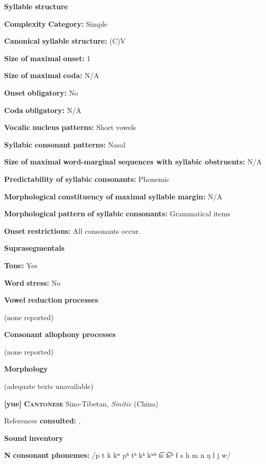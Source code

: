 \textbf{Syllable} \textbf{structure}

\textbf{Complexity} \textbf{Category:} Simple

\textbf{Canonical} \textbf{syllable} \textbf{structure:} (C)V \citep[6]{Bamgbose1966}

\textbf{Size} \textbf{of} \textbf{maximal} \textbf{onset:} 1

\textbf{Size} \textbf{of} \textbf{maximal} \textbf{coda:} N/A

\textbf{Onset} \textbf{obligatory:} No

\textbf{Coda} \textbf{obligatory:} N/A

\textbf{Vocalic} \textbf{nucleus} \textbf{patterns:} Short vowels

\textbf{Syllabic} \textbf{consonant} \textbf{patterns:} Nasal

\textbf{Size} \textbf{of} \textbf{maximal} \textbf{word{}-marginal sequences with syllabic obstruents:} N/A

\textbf{Predictability} \textbf{of} \textbf{syllabic} \textbf{consonants:} Phonemic

\textbf{Morphological} \textbf{constituency} \textbf{of} \textbf{maximal} \textbf{syllable} \textbf{margin:} N/A

\textbf{Morphological} \textbf{pattern} \textbf{of} \textbf{syllabic} \textbf{consonants:} Grammatical items

\textbf{Onset} \textbf{restrictions:} All consonants occur.

\textbf{Suprasegmentals}

\textbf{Tone:} Yes

\textbf{Word} \textbf{stress:} No

\textbf{Vowel} \textbf{reduction} \textbf{processes}

(none reported)

\textbf{Consonant} \textbf{allophony} \textbf{processes}

(none reported) 

\textbf{Morphology}

(adequate texts unavailable)

\textbf{[yue]}   \textbf{\textsc{Cantonese}}  Sino-Tibetan, \textit{Sinitic} (China)

References \textbf{consulted:} \citet{BauerBenedict1997}, \citet{MatthewsYip1994}

\textbf{Sound} \textbf{inventory}

\textbf{N} \textbf{consonant} \textbf{phonemes:} /p t k kʷ pʰ tʰ kʰ kʷʰ t͡s t͡sʰ f s h m n ŋ l j w/

